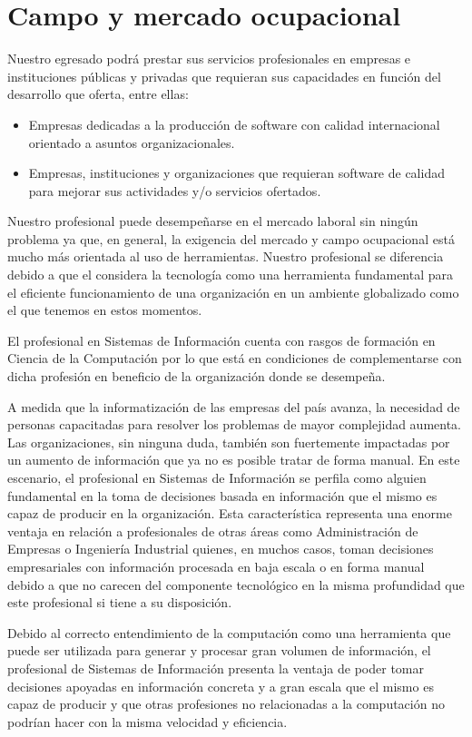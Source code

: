 \section{Campo y mercado ocupacional}\label{sec:job-positions}
Nuestro egresado podrá prestar sus servicios profesionales en empresas e instituciones públicas y privadas 
que requieran sus capacidades en función del desarrollo que oferta, entre ellas:

\begin{itemize}
\item Empresas dedicadas a la producción de software con calidad internacional orientado a asuntos organizacionales.
\item Empresas, instituciones y organizaciones que requieran software de calidad para mejorar sus actividades y/o 
      servicios ofertados.
\end{itemize}

Nuestro profesional puede desempeñarse en el mercado laboral sin ningún problema ya que, en general, la 
exigencia del mercado y campo ocupacional está mucho más orientada al uso de herramientas. 
Nuestro profesional se diferencia debido a que el considera la tecnología como una herramienta fundamental
para el eficiente funcionamiento de una organización en un ambiente globalizado como el que tenemos en estos momentos.

El profesional en Sistemas de Información cuenta con rasgos de formación en Ciencia de la Computación por 
lo que está en condiciones de complementarse con dicha profesión en beneficio de la organización donde se desempeña.

A medida que la informatización de las empresas del país avanza, la necesidad de personas 
capacitadas para resolver los problemas de mayor complejidad aumenta. Las organizaciones, sin ninguna duda, 
también son fuertemente impactadas por un aumento de información que ya no es posible tratar de forma manual.
En este escenario, el profesional en Sistemas de Información se perfila como alguien fundamental en la toma 
de decisiones basada en información que el mismo es capaz de producir en la organización. 
Esta característica representa una enorme ventaja en relación a profesionales de otras áreas como 
Administración de Empresas o Ingeniería Industrial quienes, en muchos casos, toman decisiones empresariales 
con información procesada en baja escala o en forma manual debido a que no carecen del componente 
tecnológico en la misma profundidad que este profesional si tiene a su disposición. 

Debido al correcto entendimiento de la computación como una herramienta que puede ser utilizada para 
generar y procesar gran volumen de información, el profesional de Sistemas de Información presenta 
la ventaja de poder tomar decisiones apoyadas en información concreta y a gran escala que el mismo es 
capaz de producir y que otras profesiones no relacionadas a la computación no podrían hacer con 
la misma velocidad y eficiencia.
